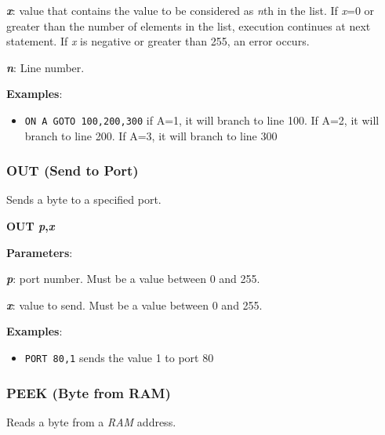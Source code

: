     \hspace{1cm}\textbf{\textit{x}}: value that contains the value to be
    considered as \textit{n}th in the list. If \textit{x}=0 or greater than the
    number of elements in the list, execution continues at next statement. If
    \textit{x} is negative or greater than 255, an error occurs.

    \hspace{1cm}\textbf{\textit{n}}: Line number.

    \textbf{Examples}:
    \begin{itemize}
        \item \texttt{ON A GOTO 100,200,300} if A=1, it will branch to line 100.
        If A=2, it will branch to line 200. If A=3, it will branch to line 300
    \end{itemize}

    \subsubsection{{OUT (Send to Port)}}
    \label{msbasic:lang:out}
    Sends a byte to a specified port.

    \hspace{1.9cm}\textbf{OUT \textit{p},\textit{x}}

    \textbf{Parameters}:

    \hspace{1cm}\textbf{\textit{p}}: port number. Must be a value between 0 and
    255.

    \hspace{1cm}\textbf{\textit{x}}: value to send. Must be a value between 0
    and 255.

    \textbf{Examples}:
    \begin{itemize}
        \item \texttt{PORT 80,1} sends the value 1 to port 80
    \end{itemize}

    \subsubsection{{PEEK (Byte from RAM)}}
    \label{msbasic:lang:peek}
    Reads a byte from a \textit{RAM} address.

